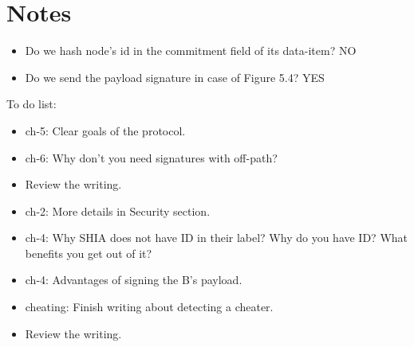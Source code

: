 \chapter{Notes}

\begin{itemize}
	\item Do we hash node's id in the commitment field of its data-item? NO
	\item Do we send the payload signature in case of Figure 5.4? YES
\end{itemize}

To do list:
\begin{itemize}
	\item ch-5: Clear goals of the protocol.
	\item ch-6: Why don't you need signatures with off-path?
	\item Review the writing.
	\item ch-2: More details in Security section.
	\item ch-4: Why SHIA does not have ID in their label? Why do you have ID? What benefits you get out of it?
	\item ch-4: Advantages of signing the B's payload.
	\item cheating: Finish writing about detecting a cheater.
	\item Review the writing.
	
\end{itemize}